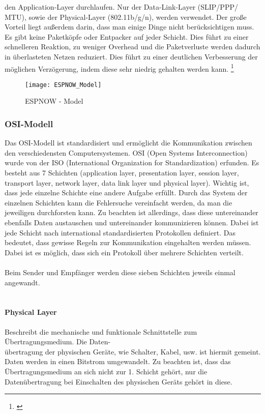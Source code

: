 \documentclass[titlepage,12pt,twoside]{article}
\begin{document}
den Application-Layer durchlaufen. Nur der Data-Link-Layer (SLIP/PPP/\\MTU), 
sowie der Physical-Layer (802.11b/g/n), werden verwendet. 
Der große Vorteil liegt außerdem 
darin, dass man einige Dinge nicht berücksichtigen muss. Es gibt keine 
Paketköpfe oder Entpacker auf jeder Schicht. Dies führt zu einer schnelleren 
Reaktion, zu weniger Overhead und die Paketverluste werden dadurch in überlasteten Netzen 
reduziert. Dies führt zu einer deutlichen Verbesserung der möglichen
Verzögerung, indem diese sehr niedrig gehalten werden kann. \footnote{\cite{espressif}} \\
\begin{figure}[H]
	\begin{center}
		\scalebox{1.0}
		{\texttt{[image: ESPNOW\_Model]}}
		\caption{ESPNOW - Model}
		\label{fig:ESPNOW_Model}
	\end{center}
\end{figure}
\newpage
\subsubsection{OSI-Modell}
\label{chap:OSI-Modell}
Das OSI-Modell ist standardisiert und ermöglicht die Kommunikation zwischen den 
verschiedensten Computersystemen. OSI (Open Systems Interconnection) wurde von der 
ISO (International Organization for Standardization) erfunden. 
Es besteht aus 7 Schichten (application layer, presentation layer, session layer, 
transport layer, network layer, data link layer und physical layer). Wichtig ist, 
dass jede einzelne Schichte eine andere Aufgabe erfüllt. Durch das System der 
einzelnen Schichten kann die Fehlersuche vereinfacht werden, da man die jeweiligen 
durchforsten kann. Zu beachten ist allerdings, dass diese untereinander ebenfalls 
Daten austauschen und untereinander kommunizieren können. Dabei ist jede Schicht 
nach international standardisierten Protokollen definiert. Das bedeutet, dass gewisse 
Regeln zur Kommunikation eingehalten werden müssen. Dabei ist es möglich, dass sich 
ein Protokoll über mehrere Schichten verteilt. \\
\\
Beim Sender und Empfänger werden diese sieben Schichten jeweils einmal angewandt. \\
\\

\paragraph{Physical Layer}
\label{par:Physical Layer}
\hfill \break
\hfill \break
Beschreibt die mechanische und funktionale Schnittstelle zum Übertragungsmedium. Die 
Daten-\\übertragung der physischen Geräte, wie Schalter, Kabel, usw. ist hiermit gemeint. 
Daten werden in einen Bitstrom umgewandelt. Zu beachten ist, dass das Übertragungsmedium 
an sich nicht zur 1. Schicht gehört, nur die Datenübertragung bei Einschalten des 
physischen Geräts gehört in diese.\\
\end{document}
